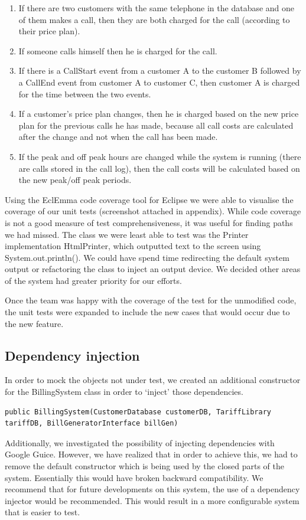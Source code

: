 \documentclass[pdftex,11pt,a4paper]{article}
\begin{document}
\begin{enumerate}
	\item If there are two customers with the same telephone in the database and one of them makes a call, then they are both charged for the call (according to their price plan).
	\item If someone calls himself then he is charged for the call.
	\item If there is a CallStart event from a customer A to the customer B followed by a CallEnd event from customer A to customer C, then customer A is charged for the time between the two events.
	\item If a customer’s price plan changes, then he is charged based on the new price plan for the previous calls he has made, because all call costs are calculated after the change and not when the call has been made.
	\item If the peak and off peak hours are changed while the system is running (there are calls stored in the call log), then the call costs will be calculated based on the new peak/off peak periods.
\end{enumerate}

Using the EclEmma code coverage tool for Eclipse we were able to visualise the coverage of our unit tests (screenshot attached in appendix). While code coverage is not a good measure of test comprehensiveness, it was useful for finding paths we had missed. The class we were least able to test was the Printer implementation HtmlPrinter, which outputted text to the screen using System.out.println(). We could have spend time redirecting the default system output or refactoring the class to inject an output device. We decided other areas of the system had greater priority for our efforts.

Once the team was happy with the coverage of the test for the unmodified code, the unit tests were expanded to include the new cases that would occur due to the new feature.

\subsection{Dependency injection}
In order to mock the objects not under test, we created an additional constructor for the BillingSystem class in order to ‘inject’ those dependencies.
\begin{lstlisting}
public BillingSystem(CustomerDatabase customerDB, TariffLibrary tariffDB, BillGeneratorInterface billGen)
\end{lstlisting}
Additionally, we investigated the possibility of injecting dependencies with Google Guice. However, we have realized that in order to achieve this, we had to remove the default constructor which is being used by the closed parts of the system. Essentially this would have broken backward compatibility. We recommend that for future developments on this system, the use of a dependency injector would be recommended. This would result in a more configurable system that is easier to test.
\end{document}
